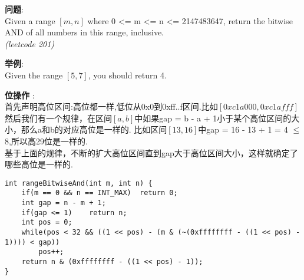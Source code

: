     
\begin{description}
    \item{\textbf{问题}}:\\
Given a range $\left[m, n\right]$ where 0 <= m <= n <= 2147483647, return the bitwise AND of all numbers in this range, inclusive.\\
\textit{(leetcode 201)}
    \item{\textbf{举例}}:\\
Given the range $\left[5, 7\right]$, you should return 4.
    \item{\textbf{位操作}} : 
    \\首先声明高位区间:高位都一样,低位从0x0到0xff..f区间.比如$\left[0xc1a000, 0xc1afff\right]$
	\\然后我们有一个规律，在区间$\left[a,b\right]$中如果gap = b - a + 1小于某个高位区间的大小，那么a和b的对应高位是一样的. 比如区间$\left[13,16\right]$中gap = 16 - 13 + 1 = 4 $\le$ 8,所以高29位是一样的.
	\\基于上面的规律，不断的扩大高位区间直到gap大于高位区间大小，这样就确定了哪些高位是一样的.
    \begin{lstlisting}
int rangeBitwiseAnd(int m, int n) {
	if(m == 0 && n == INT_MAX)	return 0;
	int gap = n - m + 1;
	if(gap <= 1)	return n;
	int pos = 0;
	while(pos < 32 && ((1 << pos) - (m & (~(0xffffffff - ((1 << pos) - 1)))) < gap))
		pos++;
	return n & (0xffffffff - ((1 << pos) - 1));
}
    \end{lstlisting}
\end{description}
